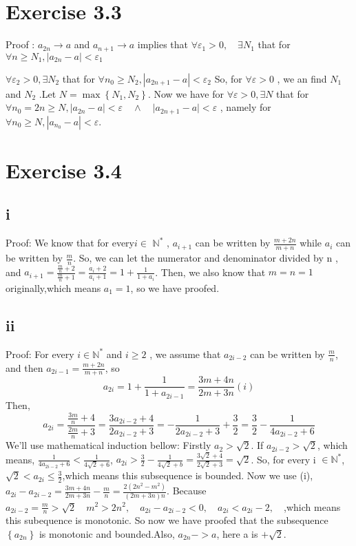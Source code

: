 \documentclass[11pt,twoside,a4paper]{article}
\begin{document}
\section{Exercise 3.3}
Proof :
$ a_{2n} \rightarrow a$  and  $a_{n+1} \rightarrow a$  implies that  $\forall \varepsilon_{1}>0, \quad \exists N_{1}$  that  for $\forall n \geqslant N_{1},\left|a_{2 n}-a\right|<\varepsilon_{1}$\par\noindent
$ \forall \varepsilon_{2}>0,  \exists N_{2}$  that  for $\forall n_{0} \ge N_{2},\left|a_{2 n+1}-a\right|<\varepsilon_{2} $
So, for  $\forall \varepsilon>0$ , we an find  $N_{1}$  and  $N_{2}$ .Let  $N=\max \left\{N_{1}, N_{2}\right\} $.
Now we have for $ \forall \varepsilon>0, \exists N$  that for $\forall n_{0}=2n\ge N,  \left|a_{2 n}-a|<\varepsilon \quad\wedge\quad \right| a_{2 n+1}-a \mid<\varepsilon $
\quad, namely for $\forall n_{0}\ge N,|a_{n_{0}}-a|<\varepsilon$.
\section{Exercise 3.4}
\subsection{i}
Proof: We know that for every$ i \in$ $\mathbb{N}^{*}$ , $a_{i+1}$ can be written by  $\frac{m+2 n}{m+n}$  while  $a_{i}$  can be written by  $\frac{m}{n}$.  So, we can let the numerator and denominator divided by  n , and  $a_{i+1}=\frac{\frac{m}{n}+2}{\frac{m}{n}+1}=\frac{a_{i}+2}{a_{i}+1}=1+\frac{1}{1+a_{i}}$. 
Then, we also know that  $m=n=1$  originally,which means $a_{1}=1$, so we have proofed.

\subsection{ii}
Proof: For every $ i\in \mathbb{N}^{*}$  and  $i \geqslant 2$ , we assume that $a_{2i-2}$ can be written by $ \frac{m}{n}$,  and then $ a_{2 i-1}=\frac{m+2 n}{m+n}$,  so $$ a_{2 i}=1+\frac{1}{1+a_{2 i-1}}=\frac{3 m+4 n}{2 m+3 n} (i)$$ Then,  $$a_{2 i}=\frac{\frac{3 m}{n}+4}{\frac{2 m}{n}+3}=\frac{3 a_{2 i-2}+4}{2 a_{2 i-2}+3}=-\frac{1}{2 a_{2 i-2}+3}+\frac{3}{2}=\frac{3}{2}-\frac{1}{4 a_{2 i-2}+6} $$
We'll use mathematical induction bellow: Firstly $a_{2}>\sqrt{2}$.
If $a_{2i-2}>\sqrt{2}$, which means, $\frac{1}{4 a_{2 i-2}+6}<\frac{1}{4 \sqrt{2}+6}$, $a_{2 i}>\frac{3}{2}-\frac{1}{4 \sqrt{2}+b}=\frac{3 \sqrt{2}+4}{2 \sqrt{2}+3}=\sqrt{2}$. 
So, for every i $\in \mathbb{N}^{*}$,$\sqrt{2}<a_{2i}\le\frac{3}{2}$,which means this subsequence is bounded.
Now we use (i),$ a_{2 i}-a_{2 i-2}=\frac{3 m+4 n}{2 m+3 n}-\frac{m}{n}=\frac{2\left(2 n^{2}-m^{2}\right)}{(2 m+3 n) n}$. Because $a_{2 i-2}=\frac{m}{n}>\sqrt{2} \quad m^{2}>2 n^{2}, \quad a_{2 i}-a_{2 i-2}<0, \quad  a_{2 i}<a_{2 i}-2, \quad $,which means this subequence is monotonic. 
So now we have proofed that the subsequence  $\left\{a_{2n}\right\}$ is monotonic and bounded.Also, $a_{2n}->a$, here a is  $+\sqrt{2}$.
\end{document}
